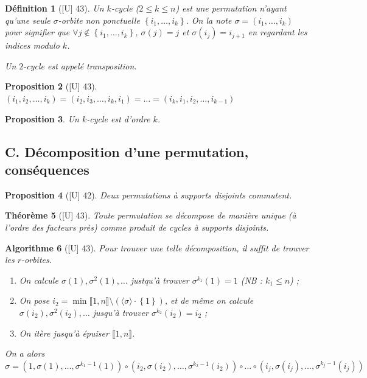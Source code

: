 \documentclass[10pt, a4paper, parskip=full, twoside, twocolumn]{report}
\newtheorem{definition}{Définition}
\newtheorem{theorem}[definition]{Théorème}
\newtheorem{proposition}[definition]{Proposition}
\newtheorem{algorithm}[definition]{Algorithme}
\begin{document}
\begin{definition}[\textnormal{[U] 43}]
	Un \emph{$k$-cycle} ($2\leq k \leq n$) est une permutation n'ayant qu'une seule $\sigma$-orbite non ponctuelle $\left\{i_1,\dots,i_k\right\}$.
	On la note $\sigma = (i_1,\dots,i_k)$ pour signifier que 
	$\forall j\notin \left\{i_1,\dots,i_k\right\}$, $\sigma(j)=j$ et $\sigma(i_j)=i_{j+1}$ en regardant les indices modulo $k$.

	Un $2$-cycle est appelé \emph{transposition}.
\end{definition}

\begin{proposition}[\textnormal{[U] 43}]
	$(i_1,i_2,\dots,i_k) = (i_2,i_3,\dots,i_k,i_1)=\dots=(i_k,i_1,i_2,\dots,i_{k-1})$
\end{proposition}

\begin{proposition}
	Un $k$-cycle est d'ordre $k$.
\end{proposition}

\subsection*{C. Décomposition d'une permutation, conséquences}

\begin{proposition}[\textnormal{[U] 42}]
	Deux permutations à supports disjoints commutent.
\end{proposition}

\begin{theorem}[\textnormal{[U] 43}]
	Toute permutation se décompose de manière unique (à l'ordre des facteurs près) comme produit de cycles à supports disjoints.
\end{theorem}

\begin{algorithm}[\textnormal{[U] 43}]
	Pour trouver une telle décomposition, il suffit de trouver les $r$-orbites.
	\begin{enumerate}
		\item On calcule $\sigma(1), \sigma^2(1),\dots$ justqu'à trouver $\sigma^{k_1}(1)=1$ (NB : $k_1\leq n$) ;
		\item On pose $i_2 = \min \llbracket 1,n\rrbracket \setminus (\langle\sigma\rangle\cdot\left\{1\right\})$, et de même on calcule $\sigma(i_2),\sigma^2(i_2),\dots$ jusqu'à trouver $\sigma^{k_2}(i_2)=i_2$ ;
		\item On itère jusqu'à épuiser $\llbracket 1,n\rrbracket$.
	\end{enumerate}
	On a alors $\sigma = (1,\sigma(1),\dots,\sigma^{k_1-1}(1))\circ (i_2, \sigma(i_2),\dots,\sigma^{k_2-1}(i_2))\circ \dots \circ(i_j, \sigma(i_j),\dots,\sigma^{k_j-1}(i_j))$
\end{algorithm}
\end{document}
